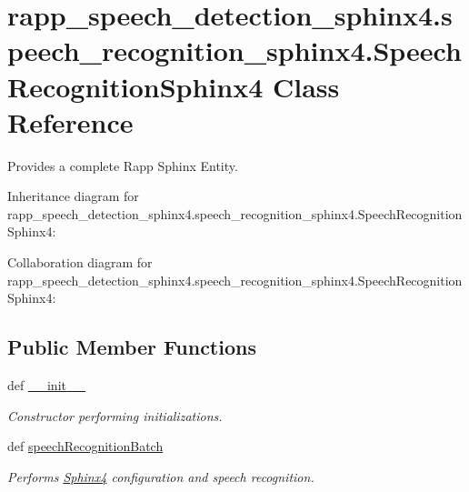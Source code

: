 \hypertarget{classrapp__speech__detection__sphinx4_1_1speech__recognition__sphinx4_1_1SpeechRecognitionSphinx4}{\section{rapp\-\_\-speech\-\_\-detection\-\_\-sphinx4.\-speech\-\_\-recognition\-\_\-sphinx4.\-Speech\-Recognition\-Sphinx4 Class Reference}
\label{classrapp__speech__detection__sphinx4_1_1speech__recognition__sphinx4_1_1SpeechRecognitionSphinx4}
}


Provides a complete Rapp Sphinx Entity.  




Inheritance diagram for rapp\-\_\-speech\-\_\-detection\-\_\-sphinx4.\-speech\-\_\-recognition\-\_\-sphinx4.\-Speech\-Recognition\-Sphinx4\-:


Collaboration diagram for rapp\-\_\-speech\-\_\-detection\-\_\-sphinx4.\-speech\-\_\-recognition\-\_\-sphinx4.\-Speech\-Recognition\-Sphinx4\-:
\subsection*{Public Member Functions}
\begin{DoxyCompactItemize}
\item 
def \hyperlink{classrapp__speech__detection__sphinx4_1_1speech__recognition__sphinx4_1_1SpeechRecognitionSphinx4_a43476824e9fc3fe7671164796b1332eb}{\-\_\-\-\_\-init\-\_\-\-\_\-}
\begin{DoxyCompactList}\small\item\em Constructor performing initializations. \end{DoxyCompactList}\item 
def \hyperlink{classrapp__speech__detection__sphinx4_1_1speech__recognition__sphinx4_1_1SpeechRecognitionSphinx4_a60e2286679d5dce9da486c7b6c3b5ad3}{speech\-Recognition\-Batch}
\begin{DoxyCompactList}\small\item\em Performs \hyperlink{classSphinx4}{Sphinx4} configuration and speech recognition. \end{DoxyCompactList}\end{DoxyCompactItemize}
